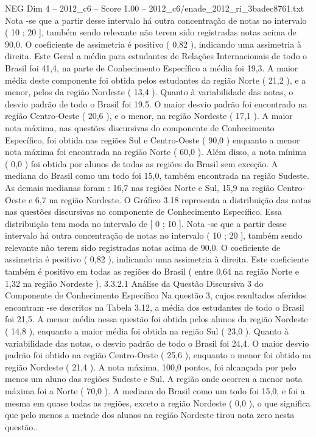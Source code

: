 \begin{textsample}{NEG Dim 4 – 2012\_c6 – Score 1.00 – 2012\_c6/enade\_2012\_ri\_3badec8761.txt}
Nota -se que a partir desse intervalo há outra concentração de notas no intervalo ( 10 ; 20 ], também sendo relevante não terem sido registradas notas acima de 90,0.
O coeficiente de assimetria é positivo ( 0,82 ), indicando uma assimetria à direita.
Este Geral a média para estudantes de Relações Internacionais de todo o Brasil foi 41,4, na parte de Conhecimento Específico a média foi 19,3.
A maior média deste componente foi obtida pelos estudantes da região Norte ( 21,2 ), e a menor, pelos da região Nordeste ( 13,4 ).
Quanto à variabilidade das notas, o desvio padrão de todo o Brasil foi 19,5.
O maior desvio padrão foi encontrado na região Centro-Oeste ( 20,6 ), e o menor, na região Nordeste ( 17,1 ).
A maior nota máxima, nas questões discursivas do componente de Conhecimento Específico, foi obtida nas regiões Sul e Centro-Oeste ( 90,0 ) enquanto a menor nota máxima foi encontrada na região Norte ( 60,0 ).
Além disso, a nota mínima ( 0,0 ) foi obtida por alunos de todas as regiões do Brasil sem exceção.
A mediana do Brasil como um todo foi 15,0, também encontrada na região Sudeste.
As demais medianas foram : 16,7 nas regiões Norte e Sul, 15,9 na região Centro-Oeste e 6,7 na região Nordeste.
O Gráfico 3.18 representa a distribuição das notas nas questões discursivas no componente de Conhecimento Específico.
Essa distribuição tem moda no intervalo de [ 0 ; 10 ].
Nota -se que a partir desse intervalo há outra concentração de notas no intervalo ( 10 ; 20 ], também sendo relevante não terem sido registradas notas acima de 90,0.
O coeficiente de assimetria é positivo ( 0,82 ), indicando uma assimetria à direita.
Este coeficiente também é positivo em todas as regiões do Brasil ( entre 0,64 na região Norte e 1,32 na região Nordeste ). 3.3.2.1 Análise da Questão Discursiva 3 do Componente de Conhecimento Específico Na questão 3, cujos resultados aferidos encontram -se descritos na Tabela 3.12, a média dos estudantes de todo o Brasil foi 21,5.
A menor média nessa questão foi obtida pelos alunos da região Nordeste ( 14,8 ), enquanto a maior média foi obtida na região Sul ( 23,0 ).
Quanto à variabilidade das notas, o desvio padrão de todo o Brasil foi 24,4.
O maior desvio padrão foi obtido na região Centro-Oeste ( 25,6 ), enquanto o menor foi obtido na região Nordeste ( 21,4 ).
A nota máxima, 100,0 pontos, foi alcançada por pelo menos um aluno das regiões Sudeste e Sul.
A região onde ocorreu a menor nota máxima foi a Norte ( 70,0 ).
A mediana do Brasil como um todo foi 15,0, e foi a mesma em quase todas as regiões, exceto a região Nordeste ( 0,0 ), o que significa que pelo menos a metade dos alunos na região Nordeste tirou nota zero nesta questão..

\end{textsample}
